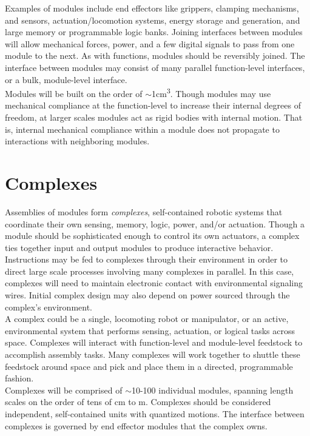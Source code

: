 {Examples of modules include end effectors like grippers, clamping mechanisms, and sensors, actuation/locomotion systems, energy storage and generation, and large memory or programmable logic banks.  Joining interfaces between modules will allow mechanical forces, power, and a few digital signals to pass from one module to the next.  As with functions, modules should be reversibly joined.  The interface between modules may consist of many parallel function-level interfaces, or a bulk, module-level interface.\\

Modules will be built on the order of $\sim$1cm\textsuperscript{3}.  Though modules may use mechanical compliance at the function-level to increase their internal degrees of freedom, at larger scales modules act as rigid bodies with internal motion.  That is, internal mechanical compliance within a module does not propagate to interactions with neighboring modules.%

\section{Complexes}

Assemblies of modules form \textit{complexes}, self-contained robotic systems that coordinate their own sensing, memory, logic, power, and/or actuation.  Though a module should be sophisticated enough to control its own actuators, a complex ties together input and output modules to produce interactive behavior.  Instructions may be fed to complexes through their environment in order to direct large scale processes involving many complexes in parallel.  In this case, complexes will need to maintain electronic contact with environmental signaling wires.  Initial complex design may also depend on power sourced through the complex's environment.\\

A complex could be a single, locomoting robot or manipulator, or an active, environmental system that performs sensing, actuation, or logical tasks across space.  Complexes will interact with function-level and module-level feedstock to accomplish assembly tasks.  Many complexes will work together to shuttle these feedstock around space and pick and place them in a directed, programmable fashion.\\

Complexes will be comprised of $\sim$10-100 individual modules, spanning length scales on the order of tens of cm to m.  Complexes should be considered independent, self-contained units with quantized motions.  The interface between complexes is governed by end effector modules that the complex owns.

}
